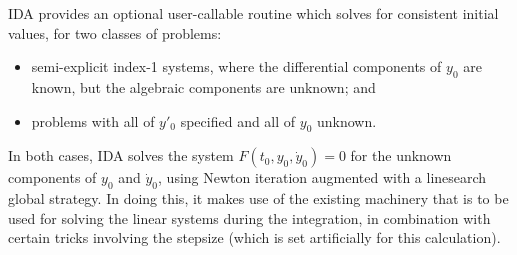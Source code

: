 IDA provides an optional user-callable routine \cite{BHP:98} which
solves for consistent initial values, for two classes of problems:
\begin{itemize}
\item semi-explicit index-1 systems, where the differential components
of $y_0$ are known, but the algebraic components are unknown; and
\item problems with all of $y'_0$ specified and all of $y_0$ unknown.
\end{itemize}

In both cases, IDA solves the system $F(t_0,y_0, {\dot y}_0) = 0$ for the
unknown components of $y_0$ and ${\dot y}_0$, using Newton iteration
augmented with a linesearch global strategy.  In doing this, it makes
use of the existing machinery that is to be used for solving the
linear systems during the integration, in combination with certain
tricks involving the stepsize (which is set artificially for this
calculation).


